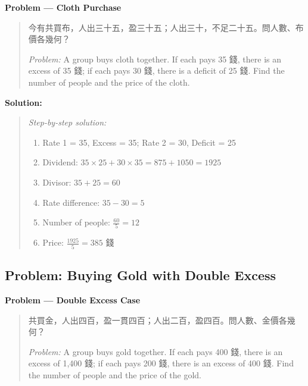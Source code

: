 \documentclass[11pt,a4paper]{article}
\newcommand{\zh}[1]{{#1}}
\newenvironment{chproblem}[1][]{%
  \par\medskip\noindent\textbf{\textcolor{sectioncolor}{#1}}\par\nopagebreak
  \begin{quote}\small
}{%
  \end{quote}\medskip
}
\newenvironment{chsolution}{%
  \par\medskip\noindent\textbf{\textcolor{notecolor}{Solution:}}\par\nopagebreak
  \begin{quote}\small
}{%
  \end{quote}\medskip
}
\newenvironment{stepbystep}{%
  \par\smallskip\noindent\textit{Step-by-step solution:}\par\nopagebreak
  \begin{enumerate}[leftmargin=2em,label=\textbf{Step \arabic*:},ref=\arabic*]
}{%
  \end{enumerate}\medskip
}
\begin{document}
\begin{chproblem}[Problem --- Cloth Purchase]
\zh{今有共買布，人出三十五，盈三十五；人出三十，不足二十五。問人數、布價各幾何？}

\medskip
\textit{Problem:} A group buys cloth together. If each pays 35 \zh{錢},
there is an excess of 35 \zh{錢}; if each pays 30 \zh{錢}, there is a deficit
of 25 \zh{錢}. Find the number of people and the price of the cloth.
\end{chproblem}

\begin{chsolution}
\begin{stepbystep}
\item Rate 1 = 35, Excess = 35; Rate 2 = 30, Deficit = 25
\item Dividend: $35 \times 25 + 30 \times 35 = 875 + 1050 = 1925$
\item Divisor: $35 + 25 = 60$
\item Rate difference: $35 - 30 = 5$
\item Number of people: $\frac{60}{5} = 12$
\item Price: $\frac{1925}{5} = 385$ \zh{錢}
\end{stepbystep}
\end{chsolution}

\subsection{Problem: Buying Gold with Double Excess}

\begin{chproblem}[Problem --- Double Excess Case]
\zh{共買金，人出四百，盈一貫四百；人出二百，盈四百。問人數、金價各幾何？}

\medskip
\textit{Problem:} A group buys gold together. If each pays 400 \zh{錢},
there is an excess of 1,400 \zh{錢}; if each pays 200 \zh{錢}, there is an
excess of 400 \zh{錢}. Find the number of people and the price of the gold.
\end{chproblem}
\end{document}

